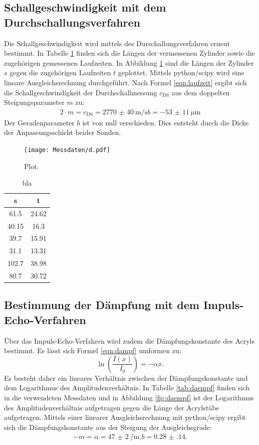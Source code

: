 \subsection{Schallgeschwindigkeit mit dem Durchschallungsverfahren}
Die Schallgeschwindigkeit wird mittels des Durschallungsverfahren erneut bestimmt.
In Tabelle \ref{tab:durchschall} finden sich die Längen der vermessenen Zylinder sowie die zugehörigen gemessenen Laufzeiten.
In Abbildung \ref{fig:durchschall} sind die Längen der Zylinder $s$ gegen die zugehörigen Laufzeiten $t$ geplottet. Mittels python/scipy \cite{scipy} wird eine lineare Ausgleichsrechnung durchgeführt.
Nach Formel \eqref{eqn:laufzeit} ergibt sich die Schallgeschwindigkeit der Durchschallmessung $c_\mathrm{DS}$ aus dem doppelten Steigungsparameter $m$ zu:
\begin{gather*}
  2\cdot m=c_\mathrm{DS}=  \SI{2770(40)}{\meter\per\second}
  b= \SI{-53(11)}{\micro\meter}
\end{gather*}
Der Geradenparameter $b$ ist von null verschieden. Dies entsteht durch die Dicke der Anpassungsschicht beider Sonden.
\begin{figure}
  \centering
  \texttt{[image: Messdaten/d.pdf]}
  \caption{Plot.}
  \label{fig:durchschall}
\end{figure}
\begin{table}
  \centering
  \caption{bla}
  \label{tab:durchschall}
\begin{tabular}{cc}
  \toprule
s & t \\
\midrule
61.5 & 24.62 \\
40.15 & 16.3 \\
39.7 & 15.91 \\
31.1 & 13.31 \\
102.7 & 38.98 \\
80.7 & 30.72 \\
\bottomrule
\end{tabular}
\end{table}
\FloatBarrier
\subsection{Bestimmung der Dämpfung mit dem Impuls-Echo-Verfahren}
Über das Impuls-Echo-Verfahren wird zudem die Dämpfungskonstante des Acryls bestimmt.
Es lässt sich Formel \eqref{eqn:dampf} umformen zu:
\begin{equation}
  \ln{\left( \frac{I(x)}{I_0}\right)}=-\alpha x \text{.}
\end{equation}
Es besteht daher ein lineares Verhältnis zwischen der Dämpfungskonstante und dem Logarithmus des Amplitudenverhältnis.
In Tabelle \ref{tab:daempf} finden sich in die verwendeten Messdaten und in Abbildung \ref{fig:daempf} ist der Logarithmus des Amplitudenverhältnis aufgetragen gegen die Länge der Acrylstäbe aufgetragen.
Mittels einer linearer Ausgleichsrechnung mit python/scipy \cite{scipy} ergibt sich die Dämpfungskonstante aus der Steigung der Ausgleichsgrade:
\begin{gather*}
-m=\alpha=\SI{47(2)}{\per\meter} \text{,}
b=  \num{0.28(14)}\text{.}
\end{gather*}


